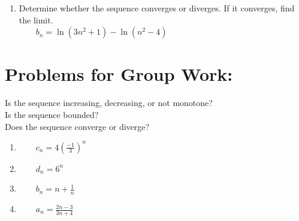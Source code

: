 \begin{enumerate}
 


\vfill


\item Determine whether the sequence converges or diverges. If it converges, find the limit.\\
\(\qquad b_n = \ln(3n^2+1) - \ln(n^2-4)\)


\vfill



%

\end{enumerate}

\pagebreak

\section*{Problems for Group Work:}



Is the sequence increasing, decreasing, or not monotone? \\
Is the sequence bounded?\\
Does the sequence converge or diverge?
\begin{enumerate}
\item \(\qquad c_n = 4\left(\frac{-1}{3}\right)^n\)\vfill
\vspace*{1.5in}
\item \(\qquad d_n = 6^n\)\vfill
\vspace*{1.5in}
\item \(\qquad b_n = n+\frac{1}{n}\)\vfill
\vspace*{1.5in}
\item \(\qquad a_n = \frac{2n-3}{3n+4}\)\vfill
\vspace*{1.5in}
\end{enumerate}


